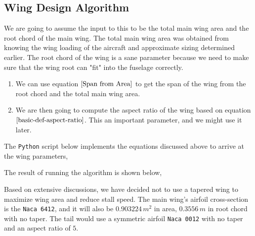 \subsection{Wing Design Algorithm}
\begin{comment}
\end{comment}
We are going to assume the input to this to be the total main wing area and the root chord of the main wing.
The total main wing area was obtained from knowing the wing loading of the aircraft and approximate sizing determined earlier. 
The root chord of the wing is a sane parameter because we need to make sure that the wing root can "fit" into the fuselage correctly.
\begin{enumerate}
\item We can use equation $\ref{Span from Area}$ to get the span of the wing from the root chord and the total main wing area.
\item We are then going to compute the aspect ratio of the wing based on equation $\ref{basic-def-aspect-ratio}$. This an important parameter, and we might use it later.
\end{enumerate}
The \texttt{Python} script below implements the equations discussed above to arrive at the wing parameters,

$$$$
The result of running the algorithm is shown below,

$$$$
Based on extensive discussions, we have decided not to use a tapered wing to maximize wing area and reduce stall speed. The main wing's airfoil cross-section is the \texttt{Naca 6412}, and it will also be $0.903224\,m^{2}$ in area, $0.3556\,m$ in root chord with no taper. The tail would use a symmetric airfoil \texttt{Naca 0012} with no taper and an aspect ratio of $5$.
